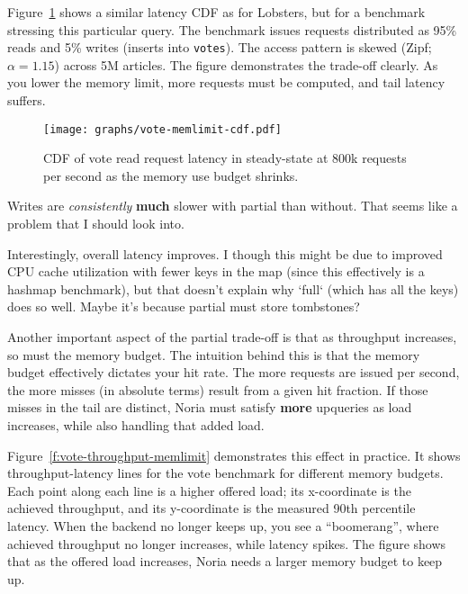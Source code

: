 Figure~\ref{f:vote-mem-latency} shows a similar latency CDF as for Lobsters, but
for a benchmark stressing this particular query. The benchmark issues requests
distributed as 95\% reads and 5\% writes (inserts into \texttt{votes}). The
access pattern is skewed (Zipf; $\alpha = 1.15$) across 5M articles. The figure
demonstrates the trade-off clearly. As you lower the memory limit, more requests
must be computed, and tail latency suffers.

\begin{figure}[ht]
  \centering
  \texttt{[image: graphs/vote-memlimit-cdf.pdf]}
  \caption{CDF of vote read request latency in steady-state at 800k requests per
  second as the memory use budget shrinks.}
  \label{f:vote-mem-latency}
\end{figure}

\begin{inprogress}
  Writes are \textit{consistently} \textbf{much} slower with partial than
  without. That seems like a problem that I should look into.
\end{inprogress}

\begin{inprogress}
  Interestingly, overall latency improves. I though this might be due to
  improved CPU cache utilization with fewer keys in the map (since this
  effectively is a hashmap benchmark), but that doesn't explain why `full`
  (which has all the keys) does so well. Maybe it's because partial must store
  tombstones?
\end{inprogress}

Another important aspect of the partial trade-off is that as throughput
increases, so must the memory budget. The intuition behind this is that the
memory budget effectively dictates your hit rate. The more requests are issued
per second, the more misses (in absolute terms) result from a given hit
fraction. If those misses in the tail are distinct, Noria must satisfy
\textbf{more} upqueries as load increases, while also handling that added load.

Figure~\ref{f:vote-throughput-memlimit} demonstrates this effect in practice. It
shows throughput-latency lines for the vote benchmark for different memory
budgets. Each point along each line is a higher offered load; its x-coordinate
is the achieved throughput, and its y-coordinate is the measured 90th percentile
latency. When the backend no longer keeps up, you see a ``boomerang'', where
achieved throughput no longer increases, while latency spikes. The figure shows
that as the offered load increases, Noria needs a larger memory budget to keep
up.


